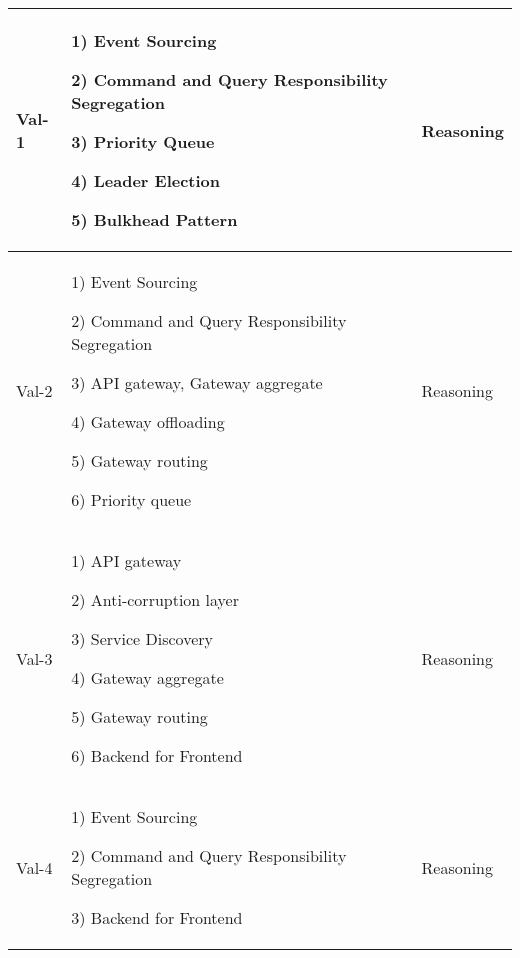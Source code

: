 \documentclass[conference]{IEEEtran}
\begin{document}
\begin{center}
    \begin{table*}
    \renewcommand*{\arraystretch}{1.8}
    \begin{tabular}{ | m{2cm} | m{8cm} |  m{2cm} |}
        \hline

        Val-1 &  

        1) Event Sourcing

        2) Command and Query Responsibility Segregation

        3) Priority Queue

        4) Leader Election

        5) Bulkhead Pattern
        
        &  Reasoning 
        
        \\
        \hline

        Val-2 &  

        1) Event Sourcing

        2) Command and Query Responsibility Segregation

        3) API gateway, Gateway aggregate

        4) Gateway offloading

        5) Gateway routing

        6) Priority queue
        
        & Reasoning
        
        \\
        \hline

        Val-3 &  

        1) API gateway

        2) Anti-corruption layer

        3) Service Discovery

        4) Gateway aggregate

        5) Gateway routing

        6) Backend for Frontend
        
        & Reasoning
        
        \\
        \hline

        Val-4 &  

        1) Event Sourcing

        2) Command and Query Responsibility Segregation

        3) Backend for Frontend

        & Reasoning
        

\end{tabular}
\end{table*}
\end{center}
\end{document}
